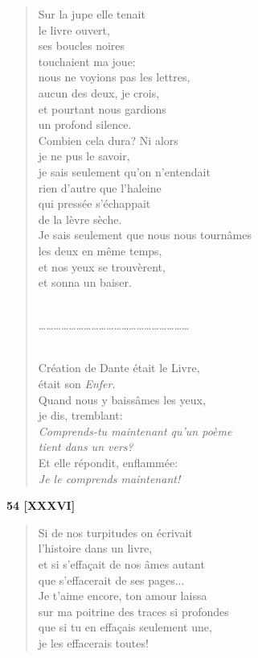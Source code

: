 \documentclass[a4paper,11pt]{book}
\begin{document}
\begin{verse}
Sur la jupe elle tenait \\
le livre ouvert, \\
ses boucles noires \\
touchaient ma joue:\\
nous ne voyions pas les lettres, \\
aucun des deux, je crois, \\
et pourtant nous gardions \\
un profond silence. \\
Combien cela dura? Ni alors \\
je ne pus le savoir, \\
je sais seulement qu'on n'entendait \\
rien d'autre que l'haleine \\
qui pressée s'échappait \\
de la lèvre sèche. \\
Je sais seulement que nous nous tournâmes \\
les deux en même temps, \\
et nos yeux se trouvèrent, \\
et sonna un baiser. \\ \

\ldots\ldots\ldots\ldots\ldots\ldots\ldots\ldots\ldots\ldots\ldots\ldots\ldots\ldots\ldots\ldots\ldots\ldots\ldots\ldots \\ \

Création de Dante était le Livre, \\
était son {\em Enfer}. \\
Quand nous y baissâmes les yeux, \\
je dis, tremblant: \\
{\em Comprends-tu maintenant qu'un poème \\
tient dans un vers?} \\
Et elle répondit, enflammée: \\
{\em Je le comprends maintenant!} \\
\end{verse}

\bigskip

\begin{center} {\bf 54 [XXXVI]} \end{center}

\begin{verse}
Si de nos turpitudes on écrivait \\
l'histoire dans un livre, \\
et si s'effa\c{c}ait de nos âmes autant \\
que s'effacerait de ses pages... \\
Je t'aime encore, ton amour laissa \\
sur ma poitrine des traces si profondes \\
que si tu en effa\c{c}ais seulement une, \\
je les effacerais toutes! \\
\end{verse}
\end{document}
